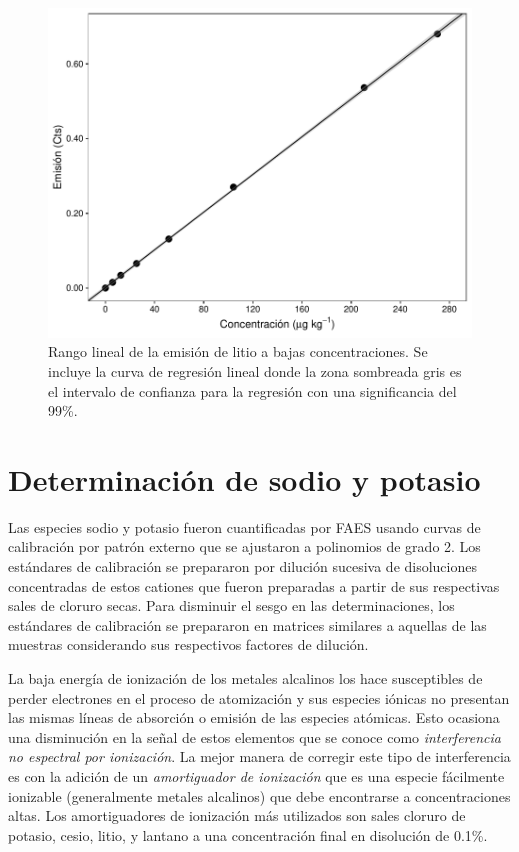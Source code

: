 \begin{figure}[H]
    \centering
    \includegraphics[height=0.388\textwidth]{App/images/LiRange.pdf}
    \caption[Rango lineal de la emisión de litio a bajas concentraciones]{Rango lineal de la emisión de litio a bajas concentraciones. Se incluye la curva de regresión lineal donde la zona sombreada gris es el intervalo de confianza para la regresión con una significancia del 99\%.}
    \label{fig:Rangolineal}
\end{figure}

\section{Determinación de sodio y potasio}
Las especies sodio y potasio fueron cuantificadas por \ac{FAES} usando curvas de calibración por patrón externo que se ajustaron a polinomios de grado 2. Los estándares de calibración se prepararon por dilución sucesiva de disoluciones concentradas de estos cationes que fueron preparadas a partir de sus respectivas sales de cloruro secas. Para disminuir el sesgo en las determinaciones, los estándares de calibración se prepararon en matrices similares a aquellas de las muestras considerando sus respectivos factores de dilución.

La baja energía de ionización de los metales alcalinos los hace susceptibles de perder electrones en el proceso de atomización y sus especies iónicas no presentan las mismas líneas de absorción o emisión de las especies atómicas. Esto ocasiona una disminución en la señal de estos elementos que se conoce como \textit{interferencia no espectral por ionización}. La mejor manera de corregir este tipo de interferencia es con la adición de un \textit{amortiguador de ionización} que es una especie fácilmente ionizable (generalmente metales alcalinos) que debe encontrarse a concentraciones altas. Los amortiguadores de ionización más utilizados son sales cloruro de potasio, cesio, litio, y lantano a una concentración final en disolución de 0.1\%. 

